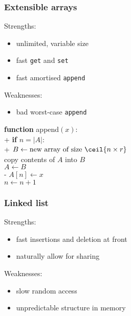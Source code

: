 \documentclass{article}
\begin{document}
\subsubsection{Extensible arrays}

\begin{multicols}{2}


\noindent Strengths:
\begin{itemize}
	\item unlimited, variable size
	\item fast \texttt{get} and \texttt{set}
	\item fast amortised \texttt{append}
\end{itemize}

\noindent Weaknesses:
\begin{itemize}
	\item bad worst-case \texttt{append}
\end{itemize}

\begin{pseudo}
\textbf{function} \textsf{append}$(x)$:												\\+
  \textbf{if} $n=|A|$:																\\+
    $B \leftarrow \text{new array of size }\ceil{n\times r}$						\\
	copy contents of $A$ into $B$													\\
	$A\leftarrow B$																	\\-
  $A[n]\leftarrow x$																\\
  $n\leftarrow n + 1$
\end{pseudo}
\end{multicols}



\subsubsection{Linked list}

Strengths:
\begin{itemize}
	\item fast insertions and deletion at front 
	\item naturally allow for sharing
\end{itemize}

Weaknesses:
\begin{itemize}
	\item slow random access
	\item unpredictable structure in memory
\end{itemize}
\end{document}
